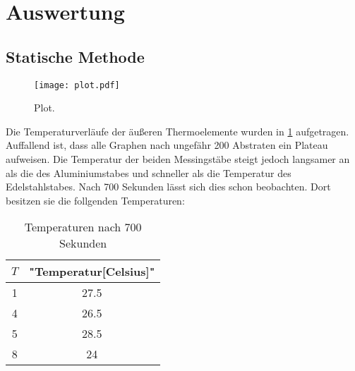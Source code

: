 \section{Auswertung}
\label{sec:Auswertung}
\subsection{Statische Methode}
\begin{figure}
  \centering
  \texttt{[image: plot.pdf]}
  \caption{Plot.}
  \label{fig:plot}
\end{figure}
Die Temperaturverläufe der äußeren Thermoelemente wurden in \ref{fig:plot} aufgetragen.
Auffallend ist, dass alle Graphen nach ungefähr 200 Abstraten ein Plateau aufweisen.
Die Temperatur der beiden Messingstäbe steigt jedoch langsamer an als die des Aluminiumstabes und schneller als die Temperatur des Edelstahlstabes.
Nach 700 Sekunden lässt sich dies schon beobachten.
Dort besitzen sie die follgenden Temperaturen:
\begin{table}
  \centering
  \caption{Temperaturen nach 700 Sekunden}
    \label{tab:t_1}
    \begin{tabular}{c c}
      \toprule
       $T$ & "Temperatur[Celsius]" \\
      \midrule
      1 & 27.5 \\
      4 & 26.5 \\
      5 & 28.5 \\
      8 & 24 \\
      \bottomrule
    \end{tabular}
\end{table}
